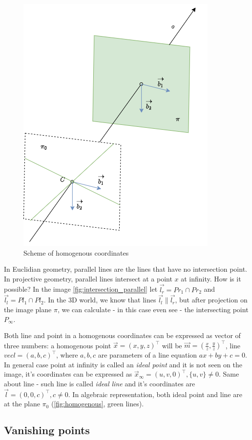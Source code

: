 \begin{figure}[h]
    \centering
    \includegraphics[width=.5\textwidth]{graphics/homogenous.png}
    \caption{Scheme of homogenous coordinates}
    \label{fig:homogenous}
\end{figure}

In Euclidian geometry, parallel lines are the lines that have no intersection point. 
In projective geometry, parallel lines intersect at a point $x$ at infinity. 
How is it possible? 
In the image \autoref{fig:intersection_parallel} let $\vec{l_r} = Pr_1 \cap Pr_2 $ and $\vec{l_l} = Pl_1 \cap Pl_2$. 
In the 3D world, we know that lines $\vec{l_l} \parallel \vec{l_r}$, but after projection on the image plane $\pi$, we can calculate - in this case even see - the intersecting point $P_{\infty}$. 

Both line and point in a homogenous coordinates can be expressed as vector of three numbers: a homogenous point $\vec{x} = (x, y, z)^\top$ will be $\vec{m} = (\frac{x}{z}, \frac{y}{z})^\top$, line $vec{l} = (a, b, c)^\top$, where $a, b, c$ are parameters of a line equation $ax + by + c = 0$. 
In general case point at infinity is called an \textit{ideal point} and it is not seen on the image, it's coordinates can be expressed as $\vec{x}_{\infty} = (u, v, 0)^\top, \{u, v\} \neq 0$. Same about line - such line is called \textit{ideal line} and it's coordinates are $\vec{l} = (0, 0, c)^\top, c \neq 0$. In algebraic representation, both ideal point and line are at the plane $\pi_0$ (\autoref{fig:homogenous}, green lines).

\subsection{Vanishing points}

